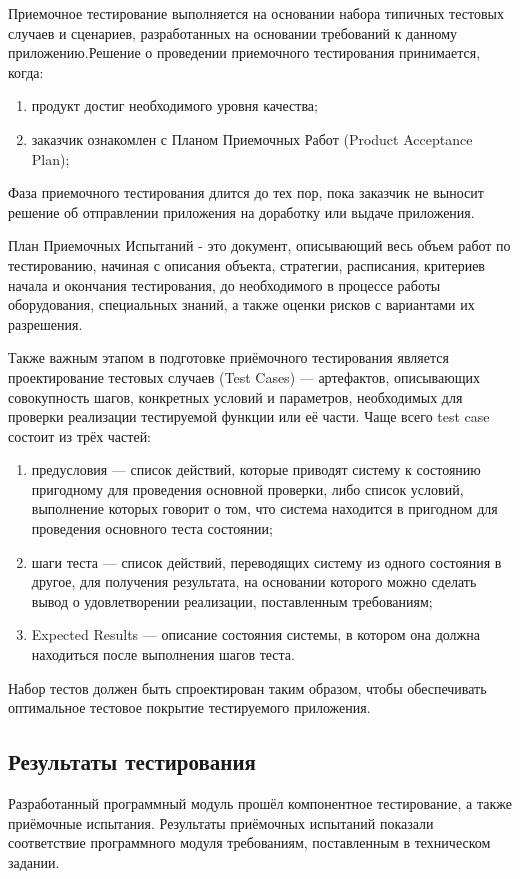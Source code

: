 Приемочное тестирование выполняется на основании набора типичных тестовых случаев и сценариев, разработанных на
основании требований к данному приложению.Решение о проведении приемочного тестирования принимается, когда:

\begin{enumerate}
\item продукт достиг необходимого уровня качества;
\item заказчик ознакомлен с Планом Приемочных Работ (Product Acceptance Plan);
\end{enumerate}

Фаза приемочного тестирования длится до тех пор, пока заказчик не выносит решение об отправлении приложения на
доработку или выдаче приложения.

План Приемочных Испытаний -  это документ, описывающий весь объем работ по тестированию, начиная с описания объекта,
стратегии, расписания, критериев начала и окончания тестирования, до необходимого в процессе работы оборудования,
специальных знаний, а также оценки рисков с вариантами их разрешения.

Также важным этапом в подготовке приёмочного тестирования является проектирование тестовых случаев (Test Cases) ---
артефактов, описывающих совокупность шагов, конкретных условий и параметров, необходимых для проверки реализации
тестируемой функции или её части. Чаще всего test case состоит из трёх частей:

\begin{enumerate}
\item предусловия --- список действий, которые приводят систему к состоянию пригодному для проведения основной
проверки, либо список условий, выполнение которых говорит о том, что система находится в пригодном для проведения
основного теста состоянии;
\item шаги теста --- список действий, переводящих систему из одного состояния в другое, для получения
результата, на основании которого можно сделать вывод о удовлетворении реализации, поставленным требованиям;
\item Expected Results --- описание состояния системы, в котором она должна находиться после выполнения шагов теста.
\end{enumerate}

Набор тестов должен быть спроектирован таким образом, чтобы обеспечивать оптимальное тестовое покрытие тестируемого
приложения.

\subsection{Результаты тестирования}

Разработанный программный модуль прошёл компонентное тестирование, а также приёмочные испытания. Результаты приёмочных
испытаний показали соответствие программного модуля требованиям, поставленным в техническом задании.

